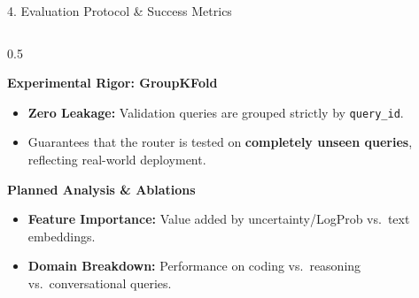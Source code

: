 \documentclass[aspectratio=169, 10pt]{beamer}
\begin{document}
\begin{frame}{4. Evaluation Protocol \& Success Metrics}
\begin{columns}[T]
        \begin{column}{0.5\textwidth}
            \begin{alertblock}{\textbf{Experimental Rigor: GroupKFold}}
                \begin{itemize}
                    \item \textbf{Zero Leakage:} Validation queries are grouped strictly by \texttt{query\_id}.
                    \item Guarantees that the router is tested on \textbf{completely unseen queries}, reflecting real-world deployment.
                \end{itemize}
            \end{alertblock}

            \vspace{0.2cm}
            \begin{exampleblock}{\textbf{Planned Analysis \& Ablations}}
                \begin{itemize}
                    \item \textbf{Feature Importance:} Value added by uncertainty/LogProb vs.\ text embeddings.
                    \item \textbf{Domain Breakdown:} Performance on coding vs.\ reasoning vs.\ conversational queries.
                \end{itemize}
            \end{exampleblock}
        \end{column}
    \end{columns}
\end{frame}
\end{document}

